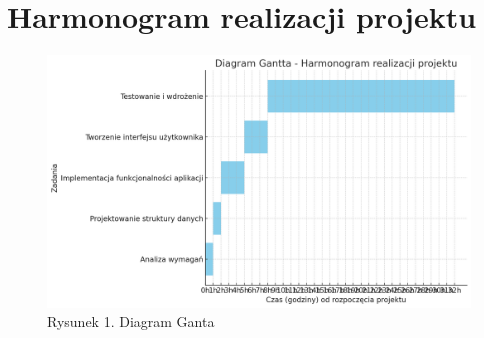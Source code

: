 \chapter{Harmonogram realizacji projektu}
\begin{figure}
    \centering
    \includegraphics[width=0.8\linewidth]{output (1).png}
    \caption{Rysunek 1. Diagram Ganta}
    \label{fig:enter-label}
\end{figure}
